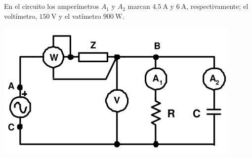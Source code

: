 \documentclass[12pt]{article}
\begin{document}
\clearpage

\section{}





En el circuito los amperímetros $A_1$ y $A_2$ marcan $\SI{4.5}{\ampere}$ y $\SI{6}{\ampere}$, respectivamente; el voltímetro, $\SI{150}{\volt}$ y el
vatímetro $\SI{900}{\watt}$.

\begin{center}
  \includegraphics{../figs/circuitoZ.pdf}
\end{center}
\end{document}
